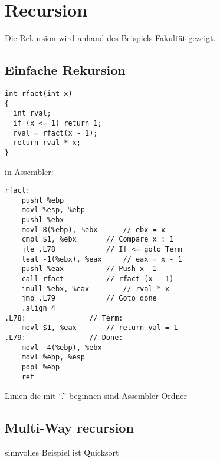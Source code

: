 \documentclass[a4paper, 11pt]{article}
\begin{document}
\section{Recursion}
Die Rekursion wird anhand des Beispiels Fakultät gezeigt.\\
\subsection{Einfache Rekursion}
\begin{lstlisting}
int rfact(int x)
{
  int rval;
  if (x <= 1) return 1;
  rval = rfact(x - 1);
  return rval * x;
}
\end{lstlisting}
in Assembler:
\begin{lstlisting}
rfact:
    pushl %ebp
    movl %esp, %ebp
    pushl %ebx
    movl 8(%ebp), %ebx 		// ebx = x
    cmpl $1, %ebx		// Compare x : 1
    jle .L78			// If <= goto Term
    leal -1(%ebx), %eax		// eax = x - 1
    pushl %eax			// Push x- 1
    call rfact			// rfact (x - 1)
    imull %ebx, %eax		// rval * x
    jmp .L79			// Goto done
    .align 4
.L78: 				// Term:
    movl $1, %eax		// return val = 1
.L79:				// Done:
    movl -4(%ebp), %ebx
    movl %ebp, %esp
    popl %ebp
    ret
\end{lstlisting}
Linien die mit ``.'' beginnen sind Assembler Ordner
\subsection{Multi-Way recursion}
sinnvolles Beispiel ist Quicksort\\
\end{document}
